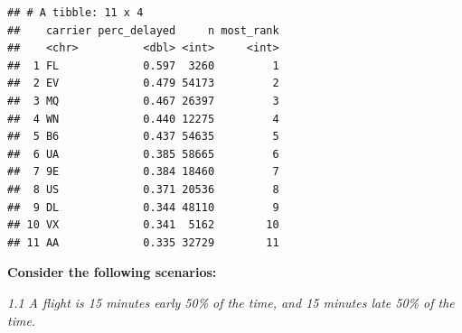 \documentclass[]{book}
\newenvironment{Shaded}{\begin{snugshade}}{\end{snugshade}}
\newcommand{\DataTypeTok}[1]{\textcolor[rgb]{0.13,0.29,0.53}{#1}}
\newcommand{\DecValTok}[1]{\textcolor[rgb]{0.00,0.00,0.81}{#1}}
\newcommand{\KeywordTok}[1]{\textcolor[rgb]{0.13,0.29,0.53}{\textbf{#1}}}
\newcommand{\NormalTok}[1]{#1}
\newcommand{\OperatorTok}[1]{\textcolor[rgb]{0.81,0.36,0.00}{\textbf{#1}}}
\newcommand{\OtherTok}[1]{\textcolor[rgb]{0.56,0.35,0.01}{#1}}
\newcommand{\StringTok}[1]{\textcolor[rgb]{0.31,0.60,0.02}{#1}}
\theoremstyle{definition}
\theoremstyle{definition}
\theoremstyle{definition}
\theoremstyle{remark}
\begin{document}
\begin{Shaded}
\end{Shaded}

\begin{verbatim}
## # A tibble: 11 x 4
##    carrier perc_delayed     n most_rank
##    <chr>          <dbl> <int>     <int>
##  1 FL             0.597  3260         1
##  2 EV             0.479 54173         2
##  3 MQ             0.467 26397         3
##  4 WN             0.440 12275         4
##  5 B6             0.437 54635         5
##  6 UA             0.385 58665         6
##  7 9E             0.384 18460         7
##  8 US             0.371 20536         8
##  9 DL             0.344 48110         9
## 10 VX             0.341  5162        10
## 11 AA             0.335 32729        11
\end{verbatim}

\textbf{Consider the following scenarios:}

\emph{1.1 A flight is 15 minutes early 50\% of the time, and 15 minutes
late 50\% of the time.}
\end{document}
